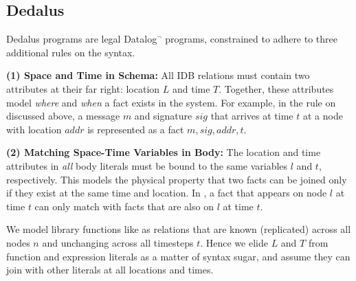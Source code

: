 

\subsection{Dedalus}
\label{sec:dedalus}
Dedalus programs are legal Datalog$^\neg$ programs, constrained to adhere to three additional rules on the syntax.

\textbf{(1) Space and Time in Schema:} All IDB relations must contain two attributes at their far right: location $L$ and time $T$.
Together, these attributes model \textit{where} and \textit{when} a fact exists in the system.
For example, in the rule on  discussed above, a  message $m$ and signature $sig$ that arrives at time $t$ at a node with location $addr$ is represented as a fact \mbox{$m, sig, addr ,t$\ded{)}}.

\textbf{(2) Matching Space-Time Variables in Body:} 
The location and time attributes in \emph{all} body literals must be bound to the same variables $l$ and $t$, respectively. This models the physical property that two facts can be joined only if they exist at the same time and location.
In , a  fact that appears on node $l$ at time $t$ can only match with  facts that are also on $l$ at time $t$. 

We model library functions like  as relations
that are known (replicated) across all nodes $n$ and unchanging across all timesteps $t$. Hence we elide $L$ and $T$ from function and expression literals as a matter of syntax sugar, and assume they can join with other literals at all locations and times.

